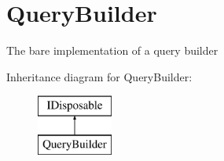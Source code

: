\hypertarget{classOTA_1_1Data_1_1QueryBuilder}{}\section{Query\+Builder}
\label{classOTA_1_1Data_1_1QueryBuilder}


The bare implementation of a query builder  


Inheritance diagram for Query\+Builder\+:\begin{figure}[H]
\begin{center}
\leavevmode
\includegraphics[height=2.000000cm]{classOTA_1_1Data_1_1QueryBuilder}
\end{center}
\end{figure}
